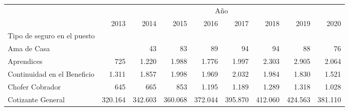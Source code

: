 \begin{tabular}{lllllllll}
\cline{1-9}
\multicolumn{1}{c}{} &
  \multicolumn{8}{|c}{Año} \\
\multicolumn{1}{c}{} &
  \multicolumn{1}{|r}{2013} &
  \multicolumn{1}{r}{2014} &
  \multicolumn{1}{r}{2015} &
  \multicolumn{1}{r}{2016} &
  \multicolumn{1}{r}{2017} &
  \multicolumn{1}{r}{2018} &
  \multicolumn{1}{r}{2019} &
  \multicolumn{1}{r}{2020} \\
\cline{1-9}
\multicolumn{1}{l}{Tipo de seguro en el puesto} &
  \multicolumn{1}{|r}{} &
  \multicolumn{1}{r}{} &
  \multicolumn{1}{r}{} &
  \multicolumn{1}{r}{} &
  \multicolumn{1}{r}{} &
  \multicolumn{1}{r}{} &
  \multicolumn{1}{r}{} &
  \multicolumn{1}{r}{} \\
\multicolumn{1}{l}{\hspace{1em}Ama de Casa} &
  \multicolumn{1}{|r}{} &
  \multicolumn{1}{r}{43} &
  \multicolumn{1}{r}{83} &
  \multicolumn{1}{r}{89} &
  \multicolumn{1}{r}{94} &
  \multicolumn{1}{r}{94} &
  \multicolumn{1}{r}{88} &
  \multicolumn{1}{r}{76} \\
\multicolumn{1}{l}{\hspace{1em}Aprendices} &
  \multicolumn{1}{|r}{725} &
  \multicolumn{1}{r}{1.220} &
  \multicolumn{1}{r}{1.988} &
  \multicolumn{1}{r}{1.776} &
  \multicolumn{1}{r}{1.997} &
  \multicolumn{1}{r}{2.303} &
  \multicolumn{1}{r}{2.905} &
  \multicolumn{1}{r}{2.064} \\
\multicolumn{1}{l}{\hspace{1em}Continuidad en el Beneficio} &
  \multicolumn{1}{|r}{1.311} &
  \multicolumn{1}{r}{1.857} &
  \multicolumn{1}{r}{1.998} &
  \multicolumn{1}{r}{1.969} &
  \multicolumn{1}{r}{2.032} &
  \multicolumn{1}{r}{1.984} &
  \multicolumn{1}{r}{1.830} &
  \multicolumn{1}{r}{1.521} \\
\multicolumn{1}{l}{\hspace{1em}Chofer Cobrador} &
  \multicolumn{1}{|r}{645} &
  \multicolumn{1}{r}{665} &
  \multicolumn{1}{r}{853} &
  \multicolumn{1}{r}{1.195} &
  \multicolumn{1}{r}{1.189} &
  \multicolumn{1}{r}{1.289} &
  \multicolumn{1}{r}{1.318} &
  \multicolumn{1}{r}{1.028} \\
\multicolumn{1}{l}{\hspace{1em}Cotizante General} &
  \multicolumn{1}{|r}{320.164} &
  \multicolumn{1}{r}{342.603} &
  \multicolumn{1}{r}{360.068} &
  \multicolumn{1}{r}{372.044} &
  \multicolumn{1}{r}{395.870} &
  \multicolumn{1}{r}{412.060} &
  \multicolumn{1}{r}{424.563} &
  \multicolumn{1}{r}{381.110} \\

\end{tabular}
